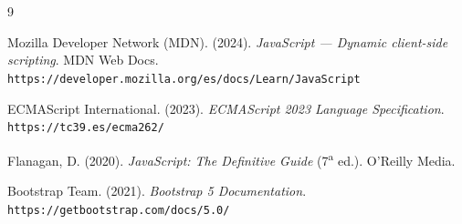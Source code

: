 \documentclass[10pt,a4paper]{article}
\begin{document}
\pagebreak
\section{\color{colorIPN}{Referencias Bibliográficas}}

\begin{thebibliography}{9}

 Mozilla Developer Network (MDN). (2024). \textit{JavaScript — Dynamic client-side scripting}. MDN Web Docs. \texttt{https://developer.mozilla.org/es/docs/Learn/JavaScript}

 ECMAScript International. (2023). \textit{ECMAScript 2023 Language Specification}. \texttt{https://tc39.es/ecma262/}

 Flanagan, D. (2020). \textit{JavaScript: The Definitive Guide} (7\textsuperscript{a} ed.). O'Reilly Media.

 Bootstrap Team. (2021). \textit{Bootstrap 5 Documentation}. \texttt{https://getbootstrap.com/docs/5.0/}

\end{thebibliography}
\end{document}
